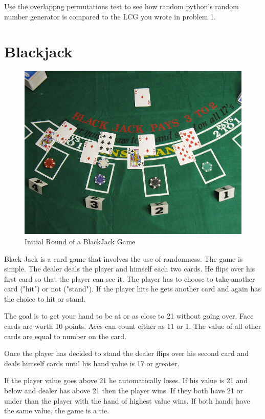 \begin{problem}
Use the overlappng permutations test to see how random python's random number generator is compared to the LCG you wrote in problem 1.
\end{problem}

\section*{Blackjack}

\begin{figure}[H]
\includegraphics[scale = .9]{Blackjack_game_1.jpg}
\caption{Initial Round of a BlackJack Game}
\end{figure}

Black Jack is a card game that involves the use of randomness.
The game is simple.
The dealer deals the player and himself each two cards.
He flips over his first card so that the player can see it.
The player has to choose to take another card ("hit") or not ("stand").
If the player hits he gets another card and again has the choice to hit or stand.

The goal is to get your hand to be at or as close to 21 without going over.
Face cards are worth 10 points.
Aces can count either as 11 or 1.
The value of all other cards are equal to number on the card.

Once the player has decided to stand the dealer flips over his second card and deals himself cards until his hand value is 17 or greater. 

If the player value goes above 21 he automatically loses.
If his value is 21 and below and dealer has above 21 then the player wins.
If they both have 21 or under than the player with the hand of highest value wins.
If both hands have the same value, the game is a tie.

